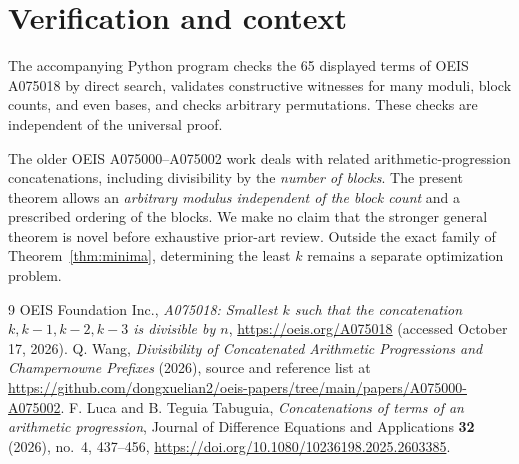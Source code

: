 \documentclass[10pt]{article}
\begin{document}
\section{Verification and context}
The accompanying Python program checks the 65 displayed terms
of OEIS A075018 by direct search, validates constructive witnesses
for many moduli, block counts, and even bases, and checks arbitrary
permutations. These checks are independent of the universal proof.

The older OEIS A075000--A075002 work \cite{wang} deals with
related arithmetic-progression concatenations, including divisibility
by the \emph{number of blocks}. The present theorem allows an
\emph{arbitrary modulus independent of the block count} and a
prescribed ordering of the blocks. We make no claim that the
stronger general theorem is novel before exhaustive prior-art review.
Outside the exact family of Theorem~\ref{thm:minima}, determining
the least $k$ remains a separate optimization problem.

\begin{thebibliography}{9}
OEIS Foundation Inc., \emph{A075018: Smallest $k$ such that the
concatenation $k,k-1,k-2,k-3$ is divisible by $n$},
\url{https://oeis.org/A075018} (accessed October 17, 2026).
Q. Wang, \emph{Divisibility of Concatenated Arithmetic Progressions
and Champernowne Prefixes} (2026), source and reference list at
\url{https://github.com/dongxuelian2/oeis-papers/tree/main/papers/A075000-A075002}.
F. Luca and B. Teguia Tabuguia, \emph{Concatenations of terms of an
arithmetic progression}, Journal of Difference Equations and Applications
\textbf{32} (2026), no.~4, 437--456,
\url{https://doi.org/10.1080/10236198.2025.2603385}.
\end{thebibliography}
\end{document}
